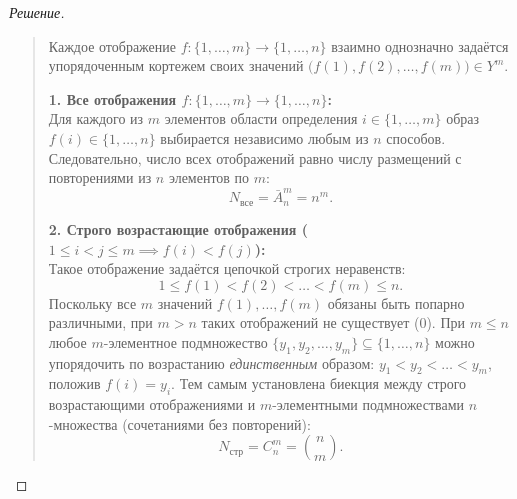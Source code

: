 \begin{proof}[Решение]~\\
    \begin{quote}
        Каждое отображение $f: \{1, \dots, m\} \to \{1, \dots, n\}$ 
        взаимно однозначно задаётся упорядоченным кортежем своих значений 
        $\bigl(f(1), f(2), \dots, f(m)\bigr) \in Y^m$.

        \textbf{1. Все отображения $f: \{1, \dots, m\} \to \{1, \dots, n\}$:}\\
        Для каждого из $m$ элементов области определения $i \in \{1, \dots, m\}$ 
        образ $f(i) \in \{1, \dots, n\}$ выбирается независимо любым из $n$ 
        способов. Следовательно, число всех отображений равно числу 
        размещений с повторениями из $n$ элементов по $m$:
        \begin{equation} \label{eq:map_all}
            N_{\text{все}} = \bar{A}_n^m = n^m. \tag{4}
        \end{equation}

        \textbf{2. Строго возрастающие отображения ($1 \le i < j \le m \implies 
        f(i) < f(j)$):}\\
        Такое отображение задаётся цепочкой строгих неравенств:
        \[
            1 \le f(1) < f(2) < \dots < f(m) \le n.
        \]
        Поскольку все $m$ значений $f(1), \dots, f(m)$ обязаны быть попарно 
        различными, при $m > n$ таких отображений не существует ($0$). При 
        $m \le n$ любое $m$-элементное подмножество $\{y_1, y_2, \dots, y_m\} 
        \subseteq \{1, \dots, n\}$ можно упорядочить по возрастанию 
        \emph{единственным} образом: $y_1 < y_2 < \dots < y_m$, положив 
        $f(i) = y_i$. Тем самым установлена биекция между строго 
        возрастающими отображениями и $m$-элементными подмножествами 
        $n$-множества (сочетаниями без повторений):
        \begin{equation} \label{eq:map_strict_inc}
            N_{\text{стр}} = C_n^m = \binom{n}{m}. \tag{5}
        \end{equation}


\end{quote}
\end{proof}
